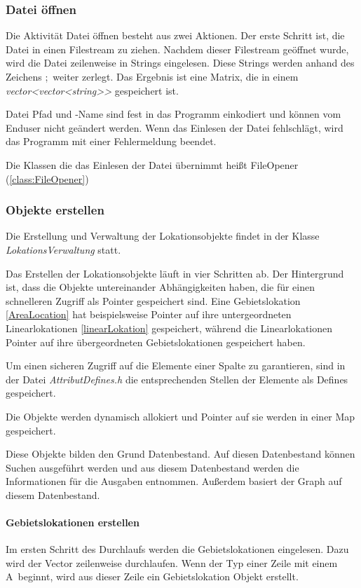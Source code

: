 \documentclass[12pt, a4paper, ngerman]{article}
\begin{document}
\subsubsection{Datei öffnen \label{dateiOeffnen}}
Die Aktivität Datei öffnen besteht aus zwei Aktionen. Der erste Schritt ist, die Datei in einen Filestream zu ziehen. Nachdem dieser Filestream geöffnet wurde, wird die Datei zeilenweise in Strings eingelesen. Diese Strings werden anhand des Zeichens \glqq ;\grqq~weiter zerlegt. Das Ergebnis ist eine Matrix, die in einem \textit{vector\textless vector\textless string\textgreater \textgreater} gespeichert ist.

Datei Pfad und -Name sind fest in das Programm einkodiert und können vom Enduser nicht geändert werden. Wenn das Einlesen der Datei fehlschlägt, wird das Programm mit einer Fehlermeldung beendet.

Die Klassen die das Einlesen der Datei übernimmt heißt FileOpener (\ref{class:FileOpener})
\subsubsection{Objekte erstellen \label{objekteErstellen}}
Die Erstellung und Verwaltung der Lokationsobjekte findet in der Klasse \textit{LokationsVerwaltung} statt. 

Das Erstellen der Lokationsobjekte läuft in vier Schritten ab. Der Hintergrund ist, dass die Objekte untereinander Abhängigkeiten haben, die für einen schnelleren Zugriff als Pointer gespeichert sind. Eine Gebietslokation  \ref{AreaLocation} hat beispielsweise Pointer auf ihre untergeordneten Linearlokationen \ref{linearLokation} gespeichert, während die Linearlokationen Pointer auf ihre übergeordneten Gebietslokationen gespeichert haben.

Um einen sicheren Zugriff auf die Elemente einer Spalte zu garantieren, sind in der Datei \textit{AttributDefines.h} die entsprechenden Stellen der Elemente als Defines gespeichert.

Die Objekte werden dynamisch allokiert und Pointer auf sie werden in einer Map gespeichert.  

Diese Objekte bilden den Grund Datenbestand. Auf diesen Datenbestand können Suchen ausgeführt werden und aus diesem Datenbestand werden die Informationen für die Ausgaben entnommen. Außerdem basiert der Graph auf diesem Datenbestand.

\paragraph{Gebietslokationen erstellen \label{par:gebietsLokationenErstellen}}
Im ersten Schritt des Durchlaufs werden die Gebietslokationen eingelesen. Dazu wird der Vector zeilenweise durchlaufen. Wenn der Typ einer Zeile mit einem \glqq A\grqq~beginnt, wird aus dieser Zeile ein Gebietslokation Objekt erstellt.
\end{document}
